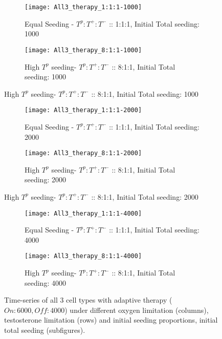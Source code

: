 \begin{figure}[h!]
  \centering
  \begin{subfigure}[b]{\textwidth}
    \centering
    \texttt{[image: All3\_therapy\_1:1:1-1000]}
    \caption{Equal Seeding - $T^p:T^+:T^-$ :: 1:1:1, Initial Total seeding: 1000}
    \label{fig_therapy-AT_1:1:1-1000}
  \end{subfigure}
  \begin{subfigure}[b]{\textwidth}
    \centering
    \texttt{[image: All3\_therapy\_8:1:1-1000]}
    \caption{High $T^p$ seeding- $T^p:T^+:T^-$ :: 8:1:1, Initial Total seeding: 1000}
    \label{fig_therapy-AT_8:1:1-1000}
  \end{subfigure}
\end{figure}
\begin{figure}[h!]\ContinuedFloat
  \centering
  \begin{subfigure}[b]{\textwidth}
    \centering
    \texttt{[image: All3\_therapy\_1:1:1-2000]}
    \caption{Equal Seeding - $T^p:T^+:T^-$ :: 1:1:1, Initial Total seeding: 2000}
    \label{fig_therapy-AT_1:1:1-2000}
  \end{subfigure}
  \begin{subfigure}[b]{\textwidth}
    \centering
    \texttt{[image: All3\_therapy\_8:1:1-2000]}
    \caption{High $T^p$ seeding- $T^p:T^+:T^-$ :: 8:1:1, Initial Total seeding: 2000}
    \label{fig_therapy-AT_8:1:1-2000}
  \end{subfigure}
\end{figure}
\begin{figure}[h!]\ContinuedFloat
  \centering
  \begin{subfigure}[b]{\textwidth}
    \centering
    \texttt{[image: All3\_therapy\_1:1:1-4000]}
    \caption{Equal Seeding - $T^p:T^+:T^-$ :: 1:1:1, Initial Total seeding: 4000}
    \label{fig_therapy-AT_1:1:1-4000}
  \end{subfigure}
  \begin{subfigure}[b]{\textwidth}
    \centering
    \texttt{[image: All3\_therapy\_8:1:1-4000]}
    \caption{High $T^p$ seeding- $T^p:T^+:T^-$ :: 8:1:1, Initial Total seeding: 4000}
    \label{fig_therapy-AT_8:1:1-4000}
  \end{subfigure}
  \caption[Time-series of all 3 cell types with adaptive therapy]{Time-series of all 3 cell types with adaptive therapy ($On:6000, Off:4000$) under different oxygen limitation (columns), testosterone limitation (rows) and initial seeding proportions, initial total seeding (subfigures).}
  \label{fig_therapy-AT}
\end{figure}

